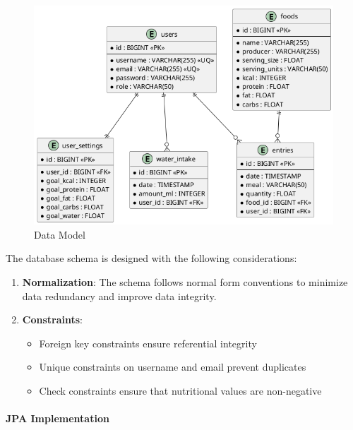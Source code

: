 \documentclass[a4paper,10pt]{article}
\begin{document}
            \begin{figure}[h]
            \centering
            \includegraphics[width=1\textwidth]{data_model}
            \caption{Data Model}
            \end{figure}

            The database schema is designed with the following considerations:

            \begin{enumerate}
                \item \textbf{Normalization}: The schema follows normal form conventions to minimize data redundancy and improve data integrity.

                \item \textbf{Constraints}:
                \begin{itemize}
                    \item Foreign key constraints ensure referential integrity
                    \item Unique constraints on username and email prevent duplicates
                    \item Check constraints ensure that nutritional values are non-negative
                \end{itemize}

            \end{enumerate}

            \paragraph{JPA Implementation}
\end{document}
